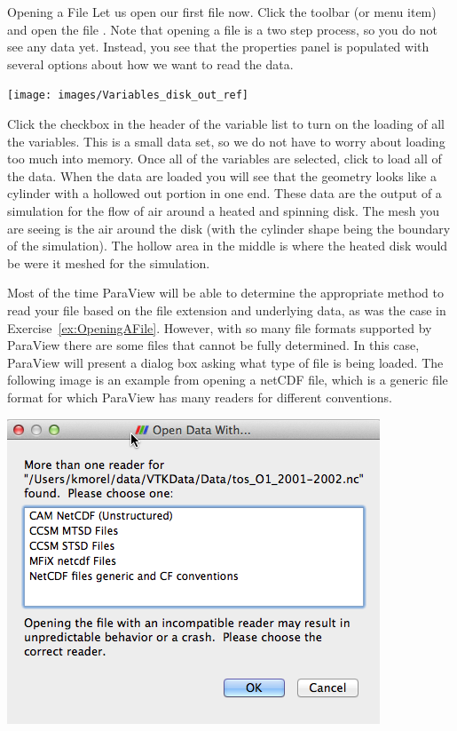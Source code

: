 \begin{exercise}{Opening a File}
  \label{ex:OpeningAFile}%
  Let us open our first file now.  Click the  
  toolbar (or menu item)~ and open the file
   .  Note that opening a
  file is a two step process, so you do not see any data yet.
  Instead, you see that the properties panel is populated with several
  options about how we want to read the data.

  \begin{inlinefig}
    \texttt{[image: images/Variables\_disk\_out\_ref]}
  \end{inlinefig}

  Click the checkbox in the header of the variable list to turn on the
  loading of all the variables.  This is a small data set, so we do not
  have to worry about loading too much into memory.  Once all of the
  variables are selected, click \apply to load all of the data.  When the
  data are loaded you will see that the geometry looks like a cylinder with
  a hollowed out portion in one end.  These data are the output of a
  simulation for the flow of air around a heated and spinning disk.  The
  mesh you are seeing is the air around the disk (with the cylinder shape
  being the boundary of the simulation).  The hollow area in the middle is
  where the heated disk would be were it meshed for the simulation.
\end{exercise}

Most of the time ParaView will be able to determine the appropriate method
to read your file based on the file extension and underlying data, as was
the case in Exercise~\ref{ex:OpeningAFile}. However, with so many file
formats supported by ParaView there are some files that cannot be fully
determined. In this case, ParaView will present a dialog box asking what
type of file is being loaded. The following image is an example from
opening a netCDF file, which is a generic file format for
which ParaView has many readers for different conventions.

\begin{inlinefig}
  \includegraphics[width=.75\scw]{images/ChooseFileType}
\end{inlinefig}

